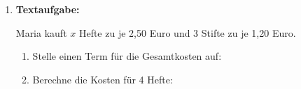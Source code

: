 \begin{enumerate}[label=\arabic*.]
\begin{enumerate}[label=\alph*)]
    \end{enumerate}

    \vspace{1cm}

    \item \textbf{Textaufgabe:}

    Maria kauft $x$ Hefte zu je 2,50 Euro und 3 Stifte zu je 1,20 Euro.

    \vspace{0.5cm}

    \begin{enumerate}[label=\alph*)]
        \item Stelle einen Term für die Gesamtkosten auf: \underline{\hspace{4cm}}

        \vspace{0.5cm}

        \item Berechne die Kosten für 4 Hefte: \underline{\hspace{4cm}}

    \end{enumerate}

\end{enumerate}